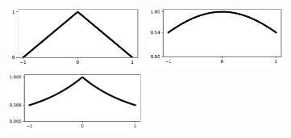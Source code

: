 \begin{figure}[h]\centering
	\begin{minipage}{0.3\linewidth}
	\centering\includegraphics[height=20mm, width=45mm]{./figures/EXP_kernel_T.pdf}
	\end{minipage}
	\begin{minipage}{0.3\linewidth}
	\centering\includegraphics[height=20mm, width=45mm]{./figures/EXP_kernel_C.pdf}
	\end{minipage}
	\begin{minipage}{0.3\linewidth}
	\centering\includegraphics[height=20mm, width=45mm]{./figures/EXP_kernel_E.pdf}
	\end{minipage}
	

\end{figure}

